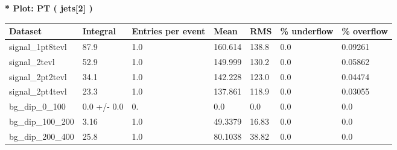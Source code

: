 \documentclass[a4paper, 10pt]{article}
\begin{document}
\textbf{* Plot: PT ( jets[2] ) }\\
   \begin{table}[H]
  \begin{center}
    \begin{tabular}{|m{23.0mm}|m{23.0mm}|m{18.0mm}|m{19.0mm}|m{19.0mm}|m{19.0mm}|m{19.0mm}|}
      \hline
      {\cellcolor{yellow}         Dataset}& {\cellcolor{yellow}         Integral}& {\cellcolor{yellow}         Entries per event}& {\cellcolor{yellow}         Mean}& {\cellcolor{yellow}         RMS}& {\cellcolor{yellow}         \% underflow}& {\cellcolor{yellow}         \% overflow}\\
      \hline
      {\cellcolor{white}         signal\_1pt8tevl}& {\cellcolor{white}         87.9}& {\cellcolor{white}         1.0}& {\cellcolor{white}         160.614}& {\cellcolor{white}         138.8}& {\cellcolor{green}         0.0}& {\cellcolor{green}         0.09261}\\
      \hline
      {\cellcolor{white}         signal\_2tevl}& {\cellcolor{white}         52.9}& {\cellcolor{white}         1.0}& {\cellcolor{white}         149.999}& {\cellcolor{white}         130.2}& {\cellcolor{green}         0.0}& {\cellcolor{green}         0.05862}\\
      \hline
      {\cellcolor{white}         signal\_2pt2tevl}& {\cellcolor{white}         34.1}& {\cellcolor{white}         1.0}& {\cellcolor{white}         142.228}& {\cellcolor{white}         123.0}& {\cellcolor{green}         0.0}& {\cellcolor{green}         0.04474}\\
      \hline
      {\cellcolor{white}         signal\_2pt4tevl}& {\cellcolor{white}         23.3}& {\cellcolor{white}         1.0}& {\cellcolor{white}         137.861}& {\cellcolor{white}         118.9}& {\cellcolor{green}         0.0}& {\cellcolor{green}         0.03055}\\
      \hline
      {\cellcolor{white}         bg\_dip\_0\_100}& {\cellcolor{white}         0.0 +/\-- 0.0}& {\cellcolor{white}         0.}& {\cellcolor{white}         0.0}& {\cellcolor{white}         0.0}& {\cellcolor{green}         0.0}& {\cellcolor{green}         0.0}\\
      \hline
      {\cellcolor{white}         bg\_dip\_100\_200}& {\cellcolor{white}         3.16}& {\cellcolor{white}         1.0}& {\cellcolor{white}         49.3379}& {\cellcolor{white}         16.83}& {\cellcolor{green}         0.0}& {\cellcolor{green}         0.0}\\
      \hline
      {\cellcolor{white}         bg\_dip\_200\_400}& {\cellcolor{white}         25.8}& {\cellcolor{white}         1.0}& {\cellcolor{white}         80.1038}& {\cellcolor{white}         38.82}& {\cellcolor{green}         0.0}& {\cellcolor{green}         0.0}\\

\end{tabular}
\end{center}
\end{table}
\end{document}
